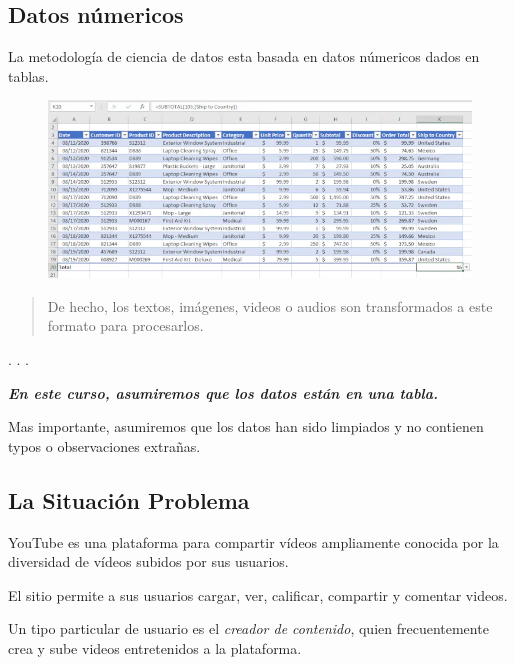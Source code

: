 \documentclass[
  letterpaper,
  DIV=11,
  numbers=noendperiod]{scrartcl}
\begin{document}
\hypertarget{datos-nuxfamericos}{%
\subsection{Datos númericos}\label{datos-nuxfamericos}}

La metodología de ciencia de datos esta basada en datos númericos dados
en tablas.

\begin{figure}

{\centering \includegraphics{images/9a292b70-64d7-475e-9ffa-22c019609752_lossy.png}

}

\end{figure}

\begin{quote}
De hecho, los textos, imágenes, videos o audios son transformados a este
formato para procesarlos.
\end{quote}

. . .

{\textbf{\emph{En este curso, asumiremos que los datos están en una
tabla.}}}

Mas importante, asumiremos que los datos han sido limpiados y no
contienen typos o observaciones extrañas.

\hypertarget{la-situaciuxf3n-problema}{%
\subsection{La Situación Problema}\label{la-situaciuxf3n-problema}}

YouTube es una plataforma para compartir vídeos ampliamente conocida por
la diversidad de vídeos subidos por sus usuarios.

El sitio permite a sus usuarios cargar, ver, calificar, compartir y
comentar videos.

Un tipo particular de usuario es el \emph{creador de contenido}, quien
frecuentemente crea y sube videos entretenidos a la plataforma.
\end{document}
